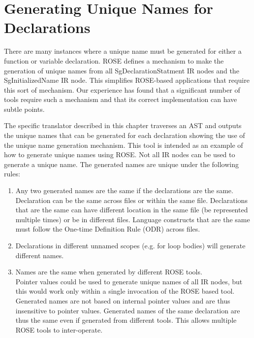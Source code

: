 \chapter{Generating Unique Names for Declarations}

     There are many instances where a unique name must be generated for
either a function or variable declaration.  ROSE defines a mechanism
to make the generation of unique names from all SgDeclarationStatment
IR nodes and the SgInitializedName IR node.  This simplifies ROSE-based
applications that require this sort of mechanism.  Our experience has found
that a significant number of tools require such a mechanism and that its
correct implementation can have subtle points.

     The specific translator described in this chapter traverses an AST and outputs the
unique names that can be generated for each declaration showing the use of the 
unique name generation mechanism.  This tool is intended as an example of how to 
generate unique names using ROSE. Not all IR nodes can be used to generate a unique
name. The generated names are unique under the following rules:
\begin{enumerate}
   \item Any two generated names are the same if the declarations are the same. \\
   Declaration can be the same across files or within the same file.  Declarations that
   are the same can have different location in the same file (be represented multiple
   times) or be in different files. Language constructs that are the same must follow 
   the One-time Definition Rule (ODR) across files.
   \item Declarations in different unnamed scopes (e.g. for loop bodies) will generate 
   different names.
   \item Names are the same when generated by different ROSE tools. \\
   Pointer values could be used to generate unique names of all IR nodes, but this would
   work only within a single invocation of the ROSE based tool.  Generated names are 
   not based on internal pointer values and are thus insensitive to pointer values.
   Generated names of the same declaration are thus the same even if generated from
   different tools.  This allows multiple ROSE tools to inter-operate.
\end{enumerate}

